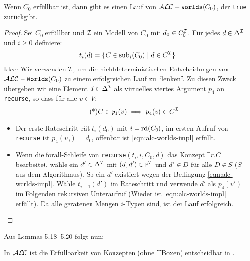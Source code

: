 \begin{lemma}
    Wenn $C_0$ erfüllbar ist, dann gibt es einen Lauf von 
    $\mathcal{A}\mathcal{L}\mathcal{C}-\texttt{Worlds}(C_0)$, der \texttt{true} zurückgibt.
    \begin{proof}
        Sei $C_0$ erfüllbar und $\mathcal{I}$ ein Modell von $C_0$ mit $d_0 \in C_0^{\mathcal{I}}$. Für jedes $d \in \Delta^{\mathcal{I}}$ und $i \geq 0$ definiere:
        \begin{align*}
            t_i(d) = \{C \in \operatorname{sub}_i(C_0) \mid d \in C^{\mathcal{I}}\}
        \end{align*}
        Idee: Wir verwenden $\mathcal{I}$, um die nichtdeterministischen Entscheidungen von $\mathcal{A}\mathcal{L}\mathcal{C}-\texttt{Worlds}(C_0)$ zu einem erfolgreichen Lauf zu \enquote{lenken}. Zu diesen Zweck übergeben wir eine Element $d \in \Delta^{\mathcal{I}}$ als virtuelles viertes Argument $p_4$ an \texttt{recurse}, so dass für alle $v \in V$:
        \begin{align*}
             \tag{*}
             \label{eqn:alc-worlds-impl}
            C \in p_1(v) \implies p_4(v) \in C^{\mathcal{I}}
        \end{align*}
        \begin{tafel}\mbox{}
            \begin{itemize}
                \item Der erste Rateschritt rät $t_i(d_0)$ mit $i = \operatorname{rd}(C_0)$,
                    im ersten Aufruf von \texttt{recurse} ist $p_4(v_0) = d_0$, offenbar ist \eqref{eqn:alc-worlds-impl} erfüllt.
                \item Wenn die forall-Schleife von \texttt{recurse}$(t_i, i, C_0, d)$ das Konzept $\exists r.C$ bearbeitet, wähle ein $d' \in \Delta^{\mathcal{I}}$ mit $(d, d') \in r^{\mathcal{I}}$ und $d' \in D$ für alle $D \in S$ ($S$ aus dem Algorithmus). So ein $d'$ existiert wegen der Bedingung \eqref{eqn:alc-worlds-impl}. Wähle $t_{i - 1}(d')$ im Rateschritt und verwende $d'$ als $p_4(v')$ im Folgenden rekursiven Unteraufruf (Wieder ist \eqref{eqn:alc-worlds-impl} erfüllt). Da alle geratenen Mengen $i$-Typen sind, ist der Lauf erfolgreich.
            \end{itemize}
        \end{tafel}
    \end{proof}
\end{lemma}

Aus Lemmas 5.18--5.20 folgt nun:
\begin{theorem}\label{thm:alc-pspace}
    In $\mathcal{A}\mathcal{L}\mathcal{C}$ ist die Erfüllbarkeit von Konzepten (ohne TBoxen) entscheidbar in \PSpace.
\end{theorem}

